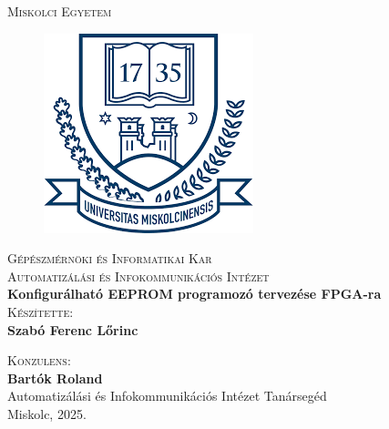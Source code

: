 \documentclass[a4paper,12pt,oneside]{book}
\newcommand{\nev}{Szabó Ferenc Lőrinc}
\newcommand{\cim}{Konfigurálható EEPROM programozó tervezése FPGA-ra}
\begin{document}
\thispagestyle{empty}

\begin{center}
		\textsc{\Large{Miskolci Egyetem}}
	
	\begin{figure}[H]
		\centering
		\includegraphics[scale=0.5]{misk_egy.png}
	\end{figure}
	
	\textsc{\Large{Gépészmérnöki és Informatikai Kar}}\\	
	\vspace{5mm}	
	\textsc{\Large{Automatizálási és Infokommunikációs Intézet}}\\
	
	\vspace{14mm}	
	\textbf{\Large{\cim}}\\
	
	\vspace{10mm}
	\textsc{Készítette:}\\
	\textbf{\nev}\\
	\vspace{20mm}
	
	\vspace{5mm}
	\textsc{Konzulens:}\\
	\textbf{Bartók Roland}\\
	Automatizálási és Infokommunikációs Intézet Tanársegéd\\
	
	\vspace{35mm} Miskolc, 2025.	
	
\end{center}
\end{document}
